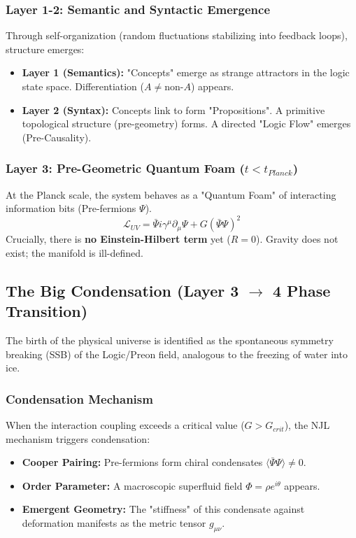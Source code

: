 \documentclass[a4paper,12pt]{article}
\begin{document}
\subsubsection{Layer 1-2: Semantic and Syntactic Emergence}
Through self-organization (random fluctuations stabilizing into feedback loops), structure emerges:
\begin{itemize}
    \item \textbf{Layer 1 (Semantics):} "Concepts" emerge as strange attractors in the logic state space. Differentiation ($A \neq \text{non-}A$) appears.
    \item \textbf{Layer 2 (Syntax):} Concepts link to form "Propositions". A primitive topological structure (pre-geometry) forms. A directed "Logic Flow" emerges (Pre-Causality).
\end{itemize}

\subsubsection{Layer 3: Pre-Geometric Quantum Foam ($t < t_{Planck}$)}
At the Planck scale, the system behaves as a "Quantum Foam" of interacting information bits (Pre-fermions $\Psi$).
\begin{equation}
    \mathcal{L}_{UV} = \bar{\Psi} i \gamma^\mu \partial_\mu \Psi + G (\bar{\Psi} \Psi)^2
\end{equation}
Crucially, there is \textbf{no Einstein-Hilbert term} yet ($R=0$). Gravity does not exist; the manifold is ill-defined.

\subsection{The Big Condensation (Layer 3 $\to$ 4 Phase Transition)}

The birth of the physical universe is identified as the spontaneous symmetry breaking (SSB) of the Logic/Preon field, analogous to the freezing of water into ice.

\subsubsection{Condensation Mechanism}
When the interaction coupling exceeds a critical value ($G > G_{crit}$), the NJL mechanism triggers condensation:
\begin{itemize}
    \item \textbf{Cooper Pairing:} Pre-fermions form chiral condensates $\langle \bar{\Psi}\Psi \rangle \neq 0$.
    \item \textbf{Order Parameter:} A macroscopic superfluid field $\Phi = \rho e^{i\theta}$ appears.
    \item \textbf{Emergent Geometry:} The "stiffness" of this condensate against deformation manifests as the metric tensor $g_{\mu\nu}$.
\end{itemize}
\end{document}

